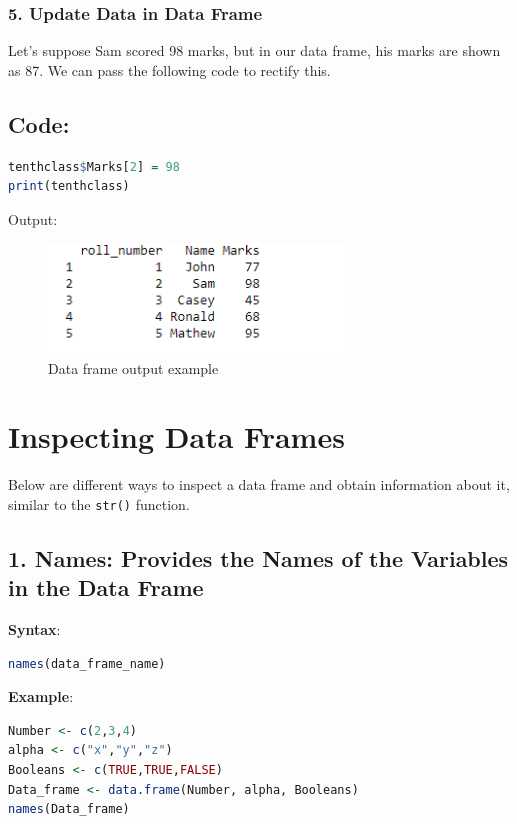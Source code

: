 \documentclass[10pt]{book}
\begin{document}
\subsubsection*{5. Update Data in Data Frame}
Let’s suppose Sam scored 98 marks, but in our data frame, his marks are shown as 87. We can pass the following code to rectify this.

\subsection*{Code:}
\begin{lstlisting}[language=R]
tenthclass$Marks[2] = 98
print(tenthclass)
\end{lstlisting}

\noindent Output:
\begin{figure}[H]
    \begin{flushleft}
        \includegraphics[width=0.7\textwidth]{Data-Frames-in-R-1-16.png}
        \caption{Data frame output example}
        \label{fig:dataframe}
    \end{flushleft}
\end{figure}



\section{Inspecting Data Frames}
Below are different ways to inspect a data frame and obtain information about it, similar to the \texttt{str()} function.

\subsection*{1. Names: Provides the Names of the Variables in the Data Frame}
\textbf{Syntax}:
\begin{lstlisting}[language=R]
names(data_frame_name)
\end{lstlisting}

\textbf{Example}:
\begin{lstlisting}[language=R]
Number <- c(2,3,4)
alpha <- c("x","y","z")
Booleans <- c(TRUE,TRUE,FALSE)
Data_frame <- data.frame(Number, alpha, Booleans)
names(Data_frame)
\end{lstlisting}
\end{document}
